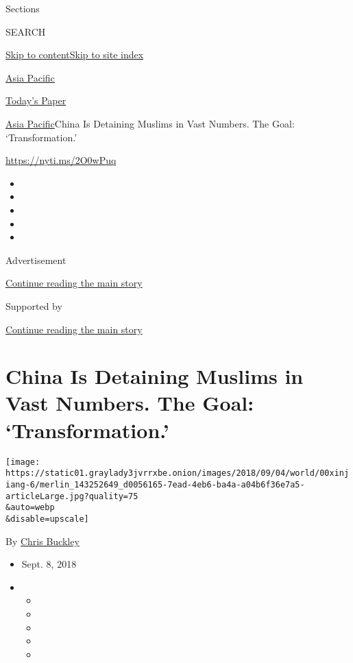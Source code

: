 Sections

SEARCH

\protect\hyperlink{site-content}{Skip to
content}\protect\hyperlink{site-index}{Skip to site index}

\href{https://www.nytimes3xbfgragh.onion/section/world/asia}{Asia
Pacific}

\href{https://myaccount.nytimes3xbfgragh.onion/auth/login?response_type=cookie\&client_id=vi}{}

\href{https://www.nytimes3xbfgragh.onion/section/todayspaper}{Today's
Paper}

\href{/section/world/asia}{Asia Pacific}\textbar{}China Is Detaining
Muslims in Vast Numbers. The Goal: `Transformation.'

\url{https://nyti.ms/2O0wPuq}

\begin{itemize}
\item
\item
\item
\item
\item
\end{itemize}

Advertisement

\protect\hyperlink{after-top}{Continue reading the main story}

Supported by

\protect\hyperlink{after-sponsor}{Continue reading the main story}

\hypertarget{china-is-detaining-muslims-in-vast-numbers-the-goal-transformation}{%
\section{China Is Detaining Muslims in Vast Numbers. The Goal:
`Transformation.'}\label{china-is-detaining-muslims-in-vast-numbers-the-goal-transformation}}

\texttt{[image: https://static01.graylady3jvrrxbe.onion/images/2018/09/04/world/00xinjiang-6/merlin\_143252649\_d0056165-7ead-4eb6-ba4a-a04b6f36e7a5-articleLarge.jpg?quality=75\\\&auto=webp\\\&disable=upscale]}

By \href{https://www.nytimes3xbfgragh.onion/by/chris-buckley}{Chris
Buckley}

\begin{itemize}
\item
  Sept. 8, 2018
\item
  \begin{itemize}
  \item
  \item
  \item
  \item
  \item
  \end{itemize}
\end{itemize}

